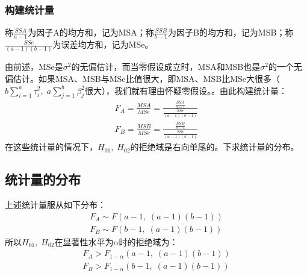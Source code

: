 \subsubsection{构建统计量}
称$\frac{SSA}{a-1}$为因子A的均方和，记为MSA；称$\frac{SSB}{b-1}$为因子B的均方和，记为MSB；称$\frac{SSe}{(a-1)(b-1)}$为误差均方和，记为MSe。\par
由前述，MSe是$\sigma^2$的无偏估计，而当零假设成立时，MSA和MSB也是$\sigma^2$的一个无偏估计。如果MSA、MSB与MSe比值很大，即MSA、MSB比MSe大很多（$b\sum\limits_{i=1}^a\tau_i^2,\;a\sum\limits_{j=1}^b\beta_j^2$很大），我们就有理由怀疑零假设。。由此构建统计量：
\begin{gather*}
	F_A=\frac{MSA}{MSe}=\frac{\frac{SSA}{a-1}}{\frac{SSe}{(a-1)(b-1)}} \\
	F_B=\frac{MSB}{MSe}=\frac{\frac{SSB}{b-1}}{\frac{SSe}{(a-1)(b-1)}} 	
\end{gather*}
在这些统计量的情况下，$H_{01},\;H_{02}$的拒绝域是右向单尾的。下求统计量的分布。

\subsection{统计量的分布}
上述统计量服从如下分布：
\begin{gather*}
	F_A\sim F(a-1,\;(a-1)(b-1)) \\
	F_B\sim F(b-1,\;(a-1)(b-1))
\end{gather*}
所以$H_{01},\;H_{02}$在显著性水平为$\alpha$时的拒绝域为：
\begin{gather*}
	F_A>F_{1-\alpha}(a-1,\;(a-1)(b-1)) \\
	F_B>F_{1-\alpha}(b-1,\;(a-1)(b-1))
\end{gather*}

